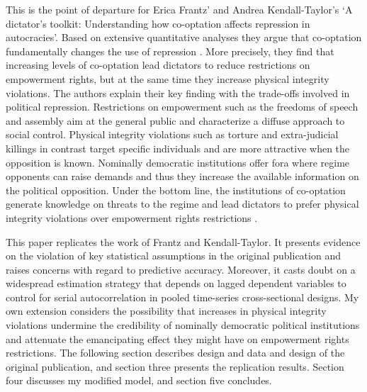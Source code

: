 This is the point of departure for Erica Frantz' and Andrea 
Kendall-Taylor's \citeyearpar{Frantz.2014} `A dictator’s 
toolkit: Understanding how co-optation affects repression in 
autocracies'. Based on extensive quantitative analyses they 
argue that co-optation fundamentally changes the use of 
repression \citep[332]{Frantz.2014}. More precisely, they 
find that increasing levels of co-optation lead dictators 
to reduce restrictions on empowerment rights, but at the 
same time they increase physical integrity violations. The 
authors explain their key finding with the trade-offs 
involved in political repression. Restrictions on 
empowerment such as the freedoms of speech and assembly aim 
at the general public and characterize a diffuse approach to
social control. Physical integrity violations such as 
torture and extra-judicial killings in contrast target 
specific individuals and are more attractive when the 
opposition is known. Nominally democratic institutions offer
fora where regime opponents can raise demands and
thus they increase the available information on the 
political opposition. Under the bottom line, the 
institutions of co-optation generate knowledge on threats to
the regime and lead dictators to prefer physical integrity 
violations over empowerment rights restrictions 
\citep[337]{Frantz.2014}.

This paper replicates the work of Frantz and Kendall-Taylor.
It presents evidence on the violation of key statistical assumptions in the original publication and raises concerns 
with regard to predictive accuracy. Moreover, it casts doubt 
on a widespread estimation strategy that depends on lagged 
dependent variables to control for serial autocorrelation in
pooled time-series cross-sectional designs. My own extension
considers the possibility that increases in physical 
integrity violations undermine the credibility of nominally
democratic political institutions and attenuate the emancipating effect they might have on empowerment rights restrictions. The following section describes design and data 
and design of the original publication, and section three 
presents the replication results. Section four discusses my 
modified model, and section five concludes.